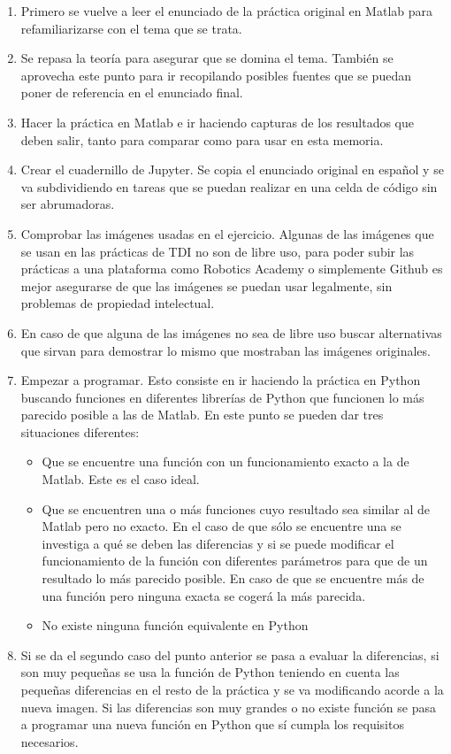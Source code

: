 \begin{enumerate}
    \item Primero se vuelve a leer el enunciado de la práctica original en Matlab para refamiliarizarse con el tema que se trata.
    \item Se repasa la teoría para asegurar que se domina el tema. También se aprovecha este punto para ir recopilando posibles fuentes que se puedan poner de referencia en el enunciado final.
    \item Hacer la práctica en Matlab e ir haciendo capturas de los resultados que deben salir, tanto para comparar como para usar en esta memoria.
    \item Crear el cuadernillo de Jupyter. Se copia el enunciado original en español y se va subdividiendo en tareas que se puedan realizar en una celda de código sin ser abrumadoras.
    \item Comprobar las imágenes usadas en el ejercicio. Algunas de las imágenes que se usan en las prácticas de TDI no son de libre uso, para poder subir las prácticas a una plataforma como Robotics Academy o simplemente Github es mejor asegurarse de que las imágenes se puedan usar legalmente, sin problemas de propiedad intelectual.
    \item En caso de que alguna de las imágenes no sea de libre uso buscar alternativas que sirvan para demostrar lo mismo que mostraban las imágenes originales.
    \item Empezar a programar. Esto consiste en ir haciendo la práctica en Python buscando funciones en diferentes librerías de Python que funcionen lo más parecido posible a las de Matlab. En este punto se pueden dar tres situaciones diferentes:
        \begin{itemize}
            \item Que se encuentre una función con un funcionamiento exacto a la de Matlab. Este es el caso ideal.
            \item Que se encuentren una o más funciones cuyo resultado sea similar al de Matlab pero no exacto. En el caso de que sólo se encuentre una se investiga a qué se deben las diferencias y si se puede modificar el funcionamiento de la función con diferentes parámetros para que de un resultado lo más parecido posible. En caso de que se encuentre más de una función pero ninguna exacta se cogerá la más parecida.
            \item  No existe ninguna función equivalente en Python
        \end{itemize}
    \item Si se da el segundo caso del punto anterior se pasa a evaluar la diferencias, si son muy pequeñas se usa la función de Python teniendo en cuenta las pequeñas diferencias en el resto de la práctica y se va modificando acorde a la nueva imagen. Si las diferencias son muy grandes o no existe función se pasa a programar una nueva función en Python que sí cumpla los requisitos necesarios.

\end{enumerate}

